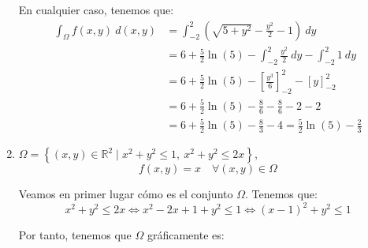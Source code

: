 \begin{ejercicio}
\begin{enumerate}
        En cualquier caso, tenemos que:
        \begin{align*}
            \int_{\Omega} f(x, y)~d(x, y)
            &= \int_{-2}^{2} \left( \sqrt{5 + y^2} -  \frac{y^2}{2} -1 \right)~dy \\
            &= 6 + \frac{5}{2}\ln(5) - \int_{-2}^{2} \frac{y^2}{2}~dy - \int_{-2}^{2} 1~dy \\
            &= 6 + \frac{5}{2}\ln(5) - \left[ \frac{y^3}{6} \right]_{-2}^{2} - \left[ y \right]_{-2}^{2} \\
            &= 6 + \frac{5}{2}\ln(5) - \frac{8}{6} - \frac{8}{6} -2 -2 \\
            &= 6 + \frac{5}{2}\ln(5) - \frac{8}{3} - 4 = \frac{5}{2}\ln(5) - \frac{2}{3}
        \end{align*}

        \item \label{ej:2.4.2.2} \(\Omega = \left\{ (x, y) \in \mathbb{R}^2 \mid x^2 + y^2 \leq 1,~x^2 + y^2 \leq 2x \right\} \),
        \[ f(x, y) = x \quad \forall (x, y) \in \Omega \]

        Veamos en primer lugar cómo es el conjunto $\Omega$. Tenemos que:
        \begin{equation*}
            x^2 + y^2 \leq 2x \iff
            x^2 - 2x + 1 + y^2 \leq 1 \iff
            (x-1)^2 + y^2 \leq 1
        \end{equation*}

        Por tanto, tenemos que $\Omega$ gráficamente es:
        \begin{figure}[H]
            \centering
        \end{figure}


\end{enumerate}
\end{ejercicio}
